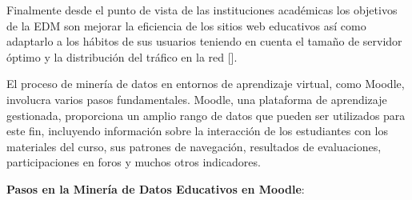 Finalmente desde el punto de vista de las instituciones académicas los objetivos de la EDM son mejorar la eficiencia de los sitios web educativos así como adaptarlo a los hábitos de sus usuarios teniendo en cuenta el tamaño de servidor óptimo y la distribución del tráfico en la red [\cite{Sebastian}].  


El proceso de minería de datos en entornos de aprendizaje virtual, como Moodle, involucra varios pasos fundamentales. Moodle, una plataforma de aprendizaje gestionada, proporciona un amplio rango de datos que pueden ser utilizados para este fin, incluyendo información sobre la interacción de los estudiantes con los materiales del curso, sus patrones de navegación, resultados de evaluaciones, participaciones en foros y muchos otros indicadores.  


\textbf{Pasos en la Minería de Datos Educativos en Moodle}:

